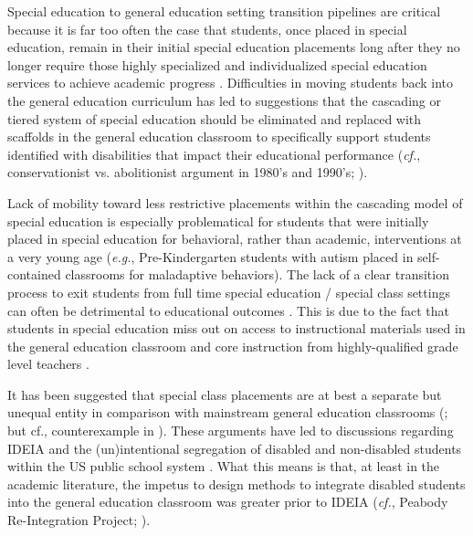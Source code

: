 \documentclass[twoside]{article}
\begin{document}
%
Special education to general education setting transition pipelines are critical because it is far too often the case that students, once placed in special education, remain in their initial special education placements long after they no longer require those highly specialized and individualized special education services to achieve academic progress \parencite{klotz2005new, johnson2005key, anderson1987consistency, conway1988mainstreaming, fuchs1992case}. Difficulties in moving students back into the general education curriculum has led to suggestions that the cascading or tiered system of special education should be eliminated and replaced with scaffolds in the general education classroom to specifically support students identified with disabilities that impact their educational performance (\textit{cf.}, conservationist vs. abolitionist argument in 1980's and 1990's; \cite{fuchs1994classroom, zigmond1995concluding, anderson1987consistency, conway1988mainstreaming}). 

Lack of mobility toward less restrictive placements within the cascading model of special education is especially problematical for students that were initially placed in special education for behavioral, rather than academic, interventions at a very young age (\textit{e.g.}, Pre-Kindergarten students with autism placed in self-contained classrooms for maladaptive behaviors). The lack of a clear transition process to exit students from full time special education / special class settings can often be detrimental to educational outcomes \parencite{savich2008inclusion}. This is due to the fact that students in special education miss out on access to instructional materials used in the general education classroom and core instruction from highly-qualified grade level teachers \parencite{gersten2006rti,brownell2010special,zigmond1995concluding,fuchs1992case}. 

It has been suggested that special class placements are at best a separate but unequal entity in comparison with mainstream general education classrooms (\cite{skiba2008achieving, bedinim1990separate}; but cf., counterexample in  \cite{kauffman2002separate, mcleskey2012we,}). These arguments have led to discussions regarding IDEIA and the (un)intentional segregation of disabled and non-disabled students within the US public school system \parencite{ferri2005tools, nolan2004us, marchese2000putting, mccarthy2012vestiges,}. What this means is that, at least in the academic literature, the impetus to design methods to integrate disabled students into the general education classroom was greater prior to IDEIA (\textit{cf.}, Peabody Re-Integration Project; \cite{fuchs1994classroom, fuchs1993conservative, daniel1997educating}).
\end{document}
